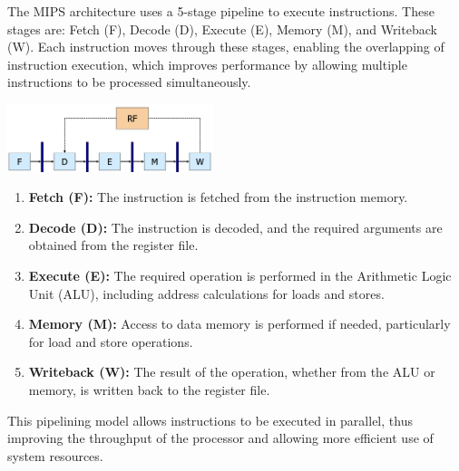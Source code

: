 The MIPS architecture uses a 5-stage pipeline to execute instructions. These stages are: Fetch (F), Decode (D), Execute (E), Memory (M), and Writeback (W). Each instruction moves through these stages, enabling the overlapping of instruction execution, which improves performance by allowing multiple instructions to be processed simultaneously.
\begin{center}
    \includegraphics[width=0.45\textwidth]{chapters/chapter4c/images/pipelined-mips.png}
\end{center}
\begin{enumerate}
    \item \textbf{Fetch (F):} The instruction is fetched from the instruction memory.
    \item \textbf{Decode (D):} The instruction is decoded, and the required arguments are obtained from the register file.
    \item \textbf{Execute (E):} The required operation is performed in the Arithmetic Logic Unit (ALU), including address calculations for loads and stores.
    \item \textbf{Memory (M):} Access to data memory is performed if needed, particularly for load and store operations.
    \item \textbf{Writeback (W):} The result of the operation, whether from the ALU or memory, is written back to the register file.
\end{enumerate}

This pipelining model allows instructions to be executed in parallel, thus improving the throughput of the processor and allowing more efficient use of system resources.

